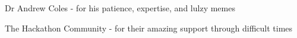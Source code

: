 Dr Andrew Coles - for his patience, expertise, and lulzy memes

The Hackathon Community - for their amazing support through difficult times